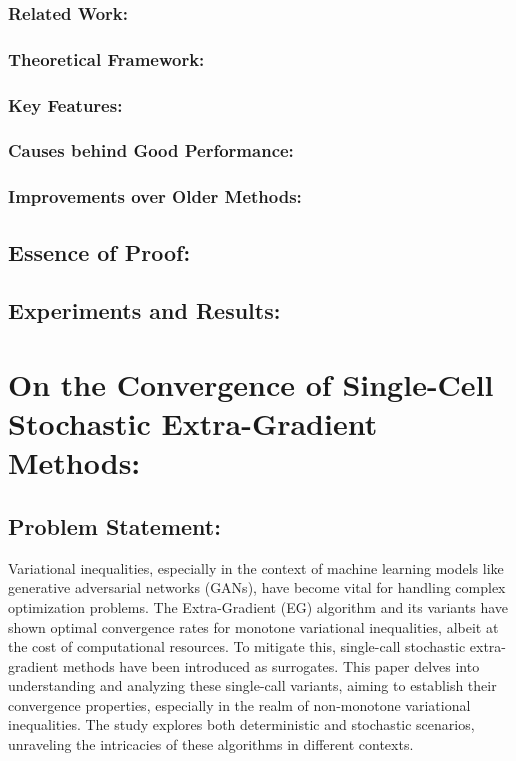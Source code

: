 \documentclass[11pt]{article}
\begin{document}
		\subsubsection{Related Work:}
		
		\subsubsection{Theoretical Framework:}
		
		\subsubsection{Key Features:}
		
		\subsubsection{Causes behind Good Performance:}
		
		\subsubsection{Improvements over Older Methods:}
	
	\subsection{Essence of Proof:} %
	
	\subsection{Experiments and Results:}

\section{On the Convergence of Single-Cell Stochastic Extra-Gradient Methods:}

	\subsection{Problem Statement:}
        Variational inequalities, especially in the context of machine learning models like generative adversarial networks (GANs), have become vital for handling complex optimization problems. The Extra-Gradient (EG) algorithm and its variants have shown optimal convergence rates for monotone variational inequalities, albeit at the cost of computational resources. To mitigate this, single-call stochastic extra-gradient methods have been introduced as surrogates. This paper delves into understanding and analyzing these single-call variants, aiming to establish their convergence properties, especially in the realm of non-monotone variational inequalities. The study explores both deterministic and stochastic scenarios, unraveling the intricacies of these algorithms in different contexts.
	
\end{document}
